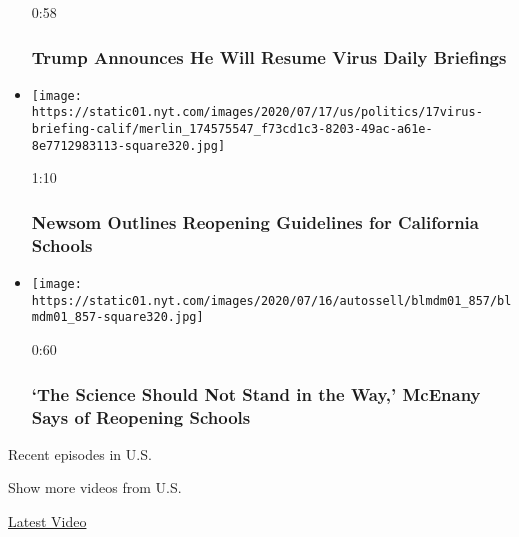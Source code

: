 \begin{itemize}
  0:58

  \hypertarget{trump-announces-he-will-resume-virus-daily-briefings}{%
  \subsubsection{Trump Announces He Will Resume Virus Daily
  Briefings}\label{trump-announces-he-will-resume-virus-daily-briefings}}
\item
  \href{https://www.nytimes.com/video/us/100000007244908/newsom-california-schools.html?action=click\&module=video-series-bar\&region=header\&pgtype=Article\&playlistId=video/u-s}{}

  \texttt{[image: https://static01.nyt.com/images/2020/07/17/us/politics/17virus-briefing-calif/merlin\_174575547\_f73cd1c3-8203-49ac-a61e-8e7712983113-square320.jpg]}

  1:10

  \hypertarget{newsom-outlines-reopening-guidelines-for-california-schools}{%
  \subsubsection{Newsom Outlines Reopening Guidelines for California
  Schools}\label{newsom-outlines-reopening-guidelines-for-california-schools}}
\item
  \href{https://www.nytimes.com/video/us/100000007243015/mcenany-trump-coronavirus-schools-science.html?action=click\&module=video-series-bar\&region=header\&pgtype=Article\&playlistId=video/u-s}{}

  \texttt{[image: https://static01.nyt.com/images/2020/07/16/autossell/blmdm01\_857/blmdm01\_857-square320.jpg]}

  0:60

  \hypertarget{the-science-should-not-stand-in-the-way-mcenany-says-of-reopening-schools}{%
  \subsubsection{`The Science Should Not Stand in the Way,' McEnany Says
  of Reopening
  Schools}\label{the-science-should-not-stand-in-the-way-mcenany-says-of-reopening-schools}}
\end{itemize}

Recent episodes in U.S.

Show more videos from U.S.

\href{/video}{}

\href{/video/latest-video}{Latest Video}

